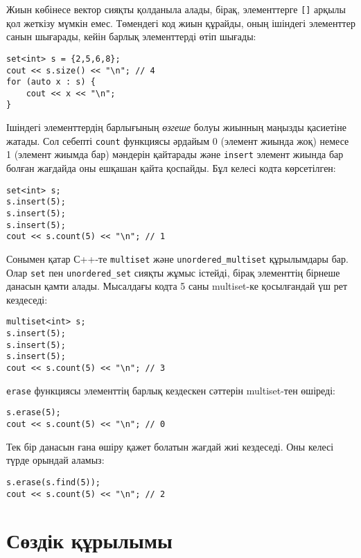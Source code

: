 Жиын көбінесе вектор сияқты қолданыла алады,
бірақ, элементтерге \texttt{[]} арқылы қол жеткізу мүмкін емес.
Төмендегі код жиын құрайды, оның ішіндегі элементтер санын шығарады,
кейін барлық элементтерді өтіп шығады:
\begin{lstlisting}
set<int> s = {2,5,6,8};
cout << s.size() << "\n"; // 4
for (auto x : s) {
    cout << x << "\n";
}
\end{lstlisting}

Ішіндегі элементтердің барлығының
\emph{өзгеше} болуы жиынның маңызды қасиетіне жатады.
Сол себепті \texttt{count} функциясы әрдайым 0 (элемент жиында жоқ)
немесе 1 (элемент жиымда бар) мәндерін қайтарады
және \texttt{insert} элемент жиында бар болған жағдайда
оны ешқашан қайта қоспайды.
Бұл келесі кодта көрсетілген:

\begin{lstlisting}
set<int> s;
s.insert(5);
s.insert(5);
s.insert(5);
cout << s.count(5) << "\n"; // 1
\end{lstlisting}

Сонымен қатар С++-те \texttt{multiset} және 
\texttt{unordered\_multiset} құрылымдары бар. 
Олар \texttt{set} пен \texttt{unordered\_set}
сияқты жұмыс істейді, бірақ элементтің бірнеше 
данасын қамти алады.
Мысалдағы кодта 5 саны multiset-ке қосылғандай үш рет кездеседі:

\begin{lstlisting}
multiset<int> s;
s.insert(5);
s.insert(5);
s.insert(5);
cout << s.count(5) << "\n"; // 3
\end{lstlisting}
\texttt{erase} функциясы элементтің 
барлық кездескен сәттерін multiset-тен өшіреді:
\begin{lstlisting}
s.erase(5);
cout << s.count(5) << "\n"; // 0
\end{lstlisting}
Тек бір данасын ғана өшіру қажет болатын жағдай жиі кездеседі.
Оны келесі түрде орындай аламыз:
\begin{lstlisting}
s.erase(s.find(5));
cout << s.count(5) << "\n"; // 2
\end{lstlisting}

\section{Сөздік құрылымы}


